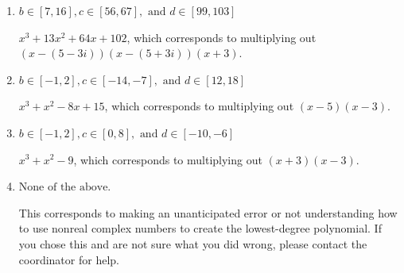 \documentclass{extbook}[14pt]
\begin{document}
\begin{enumerate}
{\begin{enumerate}[label=\Alph*.]
* $x^{3} -13 x^{2} +64 x -102$, which is the correct option.
\item \( b \in [7, 16], c \in [56, 67], \text{ and } d \in [99, 103] \)

$x^{3} +13 x^{2} +64 x + 102$, which corresponds to multiplying out $(x-(5 - 3 i))(x-(5 + 3 i))(x + 3)$.
\item \( b \in [-1, 2], c \in [-14, -7], \text{ and } d \in [12, 18] \)

$x^{3} + x^{2} -8 x + 15$, which corresponds to multiplying out $(x -5)(x -3)$.
\item \( b \in [-1, 2], c \in [0, 8], \text{ and } d \in [-10, -6] \)

$x^{3} + x^{2} -9$, which corresponds to multiplying out $(x + 3)(x -3)$.
\item \( \text{None of the above.} \)

This corresponds to making an unanticipated error or not understanding how to use nonreal complex numbers to create the lowest-degree polynomial. If you chose this and are not sure what you did wrong, please contact the coordinator for help.
\end{enumerate}

}
\end{enumerate}
\end{document}
